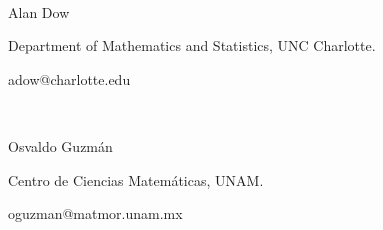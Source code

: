 \documentclass{article}%
\begin{document}
\qquad\qquad\qquad\ \ \ \ \ \ \ \ \ \ \ \ \ \ \ \ \ \ \ \qquad\qquad\qquad\ \ \ 

Alan Dow

Department of Mathematics and Statistics, UNC Charlotte.

adow@charlotte.edu

\qquad\qquad\qquad\ \ \ \ \ \ \ \ \ \ \ \ \qquad\ \ \ \ \ \qquad
\qquad\ \ \ \qquad\qquad\qquad\qquad\ \ \ \ \ \ 

Osvaldo Guzm\'{a}n

Centro de Ciencias Matem\'{a}ticas, UNAM.

oguzman@matmor.unam.mx
\end{document}
